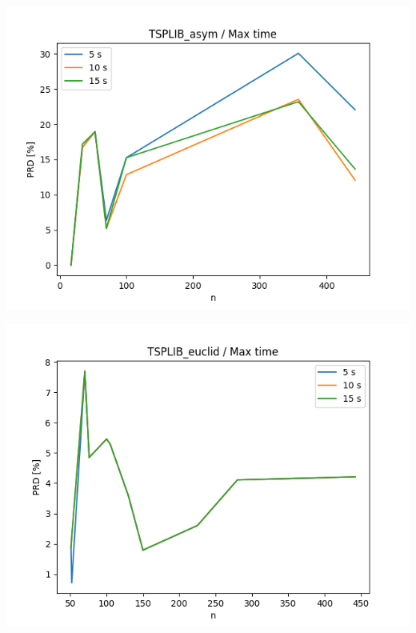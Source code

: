 \documentclass{article}
\begin{document}
\begin{center}
\includegraphics[width=\textwidth, 
                   height = 0.4\textheight, 
                   keepaspectratio]
                  {plots/tsplib_asym_9_max_time} 
\end{center}

\begin{center}
\includegraphics[width=\textwidth, 
                   height = 0.4\textheight, 
                   keepaspectratio]
                  {plots/tsplib_euclid_9_max_time} 
\end{center}
\end{document}
